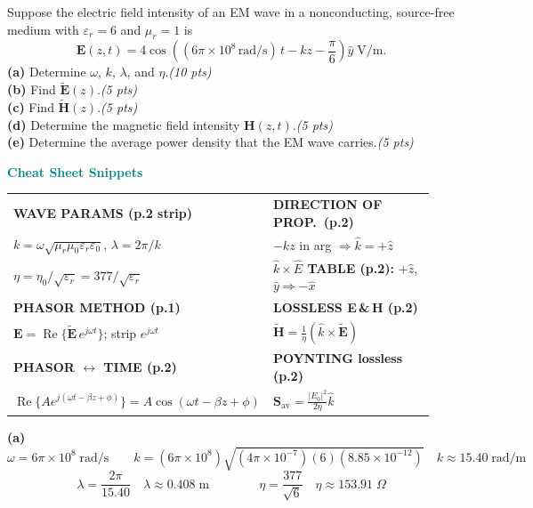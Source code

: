 \documentclass[11pt,letterpaper]{article}
\begin{document}
\begin{qbox}
Suppose the electric field intensity of an EM wave in a nonconducting, source-free medium with $\varepsilon_r=6$ and $\mu_r=1$ is
\[\mathbf{E}(z,t)=4\cos\!\left((6\pi\times10^8\,\text{rad/s})\,t-kz-\frac{\pi}{6}\right)\hat{y}\;\text{V/m}.\]
\textbf{(a)} Determine $\omega$, $k$, $\lambda$, and $\eta$.\hfill\textit{(10 pts)}\\[2pt]
\textbf{(b)} Find $\tilde{\mathbf{E}}(z)$.\hfill\textit{(5 pts)}\\[2pt]
\textbf{(c)} Find $\tilde{\mathbf{H}}(z)$.\hfill\textit{(5 pts)}\\[2pt]
\textbf{(d)} Determine the magnetic field intensity $\mathbf{H}(z,t)$.\hfill\textit{(5 pts)}\\[2pt]
\textbf{(e)} Determine the average power density that the EM wave carries.\hfill\textit{(5 pts)}
\end{qbox}

\begin{cssnip}
\textbf{\small\textcolor{teal}{Cheat Sheet Snippets}}\\[3pt]
\begin{tabular}{@{}p{0.47\linewidth}p{0.47\linewidth}@{}}
\textbf{WAVE PARAMS (p.2 strip)} & \textbf{DIRECTION OF PROP.\ (p.2)}\\
$k=\omega\sqrt{\mu_r\mu_0\varepsilon_r\varepsilon_0}$,\; $\lambda=2\pi/k$ &
$-kz$ in arg $\Rightarrow\hat{k}=+\hat{z}$\\[3pt]
$\eta=\eta_0/\sqrt{\varepsilon_r}=377/\sqrt{\varepsilon_r}$ &
\textbf{$\hat{k}\times\hat{E}$ TABLE (p.2):} $+\hat{z}$, $\hat{y}\Rightarrow-\hat{x}$\\[3pt]
\textbf{PHASOR METHOD (p.1)} & \textbf{LOSSLESS E\,\&\,H (p.2)}\\
$\mathbf{E}=\operatorname{Re}\!\{\tilde{\mathbf{E}}\,e^{j\omega t}\}$; strip $e^{j\omega t}$ &
$\tilde{\mathbf{H}}=\tfrac{1}{\eta}(\hat{k}\times\tilde{\mathbf{E}})$\\[3pt]
\textbf{PHASOR $\leftrightarrow$ TIME (p.2)} & \textbf{POYNTING lossless (p.2)}\\
$\operatorname{Re}\!\{Ae^{j(\omega t-\beta z+\phi)}\}=A\cos(\omega t-\beta z+\phi)$ &
$\mathbf{S}_\text{av}=\tfrac{|E_0|^2}{2\eta}\hat{k}$\\
\end{tabular}
\end{cssnip}

\textbf{(a)}
\[\boxed{\omega=6\pi\times10^8\;\text{rad/s}}\qquad
k=(6\pi\times10^8)\sqrt{(4\pi\times10^{-7})(6)(8.85\times10^{-12})}\quad\boxed{k\approx15.40\;\text{rad/m}}\]
\[\lambda=\frac{2\pi}{15.40}\quad\boxed{\lambda\approx0.408\;\text{m}}\qquad\qquad
\eta=\frac{377}{\sqrt{6}}\quad\boxed{\eta\approx153.91\;\Omega}\]
\end{document}
